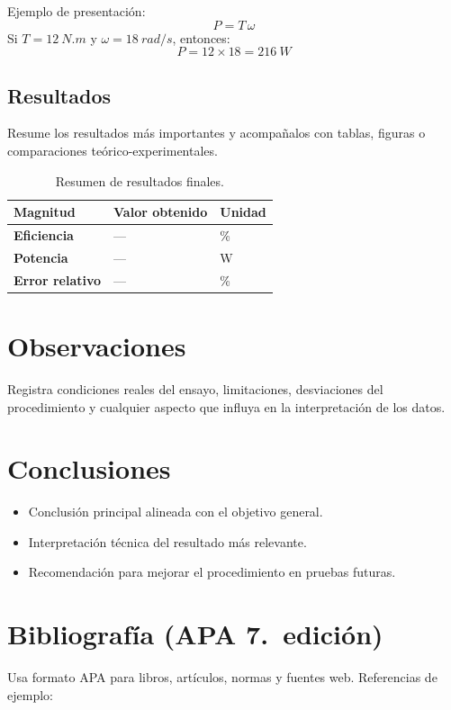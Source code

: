 \documentclass[12pt,a4paper]{article}
\begin{document}
\begin{infobox}
Ejemplo de presentaci\'on:
\[
  P = T\,\omega
\]
Si $T = \SI{12}{N.m}$ y $\omega = \SI{18}{rad/s}$, entonces:
\[
  P = 12\times 18 = \SI{216}{W}
\]
\end{infobox}

\subsection{Resultados}
Resume los resultados m\'as importantes y acompa\~nalos con tablas, figuras o comparaciones te\'orico-experimentales.

\begin{table}[H]
  \centering
  \renewcommand{\arraystretch}{1.25}
  \begin{tabular}{>{\bfseries}p{5cm} p{4cm} p{4cm}}
    \toprule
    Magnitud & Valor obtenido & Unidad \\
    \midrule
    Eficiencia & --- & \% \\
    Potencia & --- & W \\
    Error relativo & --- & \% \\
    \bottomrule
  \end{tabular}
  \caption{Resumen de resultados finales.}
\end{table}

\section{Observaciones}
Registra condiciones reales del ensayo, limitaciones, desviaciones del procedimiento y cualquier aspecto que influya en la interpretaci\'on de los datos.

\section{Conclusiones}
\begin{itemize}[leftmargin=1.5em]
  \item Conclusi\'on principal alineada con el objetivo general.
  \item Interpretaci\'on t\'ecnica del resultado m\'as relevante.
  \item Recomendaci\'on para mejorar el procedimiento en pruebas futuras.
\end{itemize}

\section{Bibliograf\'ia (APA 7.\textordfeminine~edici\'on)}
Usa formato APA para libros, art\'iculos, normas y fuentes web. Referencias de ejemplo:
\end{document}
